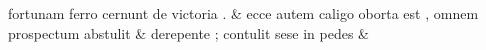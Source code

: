 \documentclass[12pt,onecolumn,twoside,a4paper]{memoir}
\begin{document}
\begin{pairs}
\begin{Leftside}
                              fortunam
                              ferro
                              cernunt
                              de
                              victoria
                              . \&
                         \stanza {}ecce
                              autem
                              caligo
                              oborta
                              est
                              ,
                              omnem
                              prospectum
                              abstulit & 
                     derepente
                              ;
                              contulit
                              sese
                              in
                              pedes \&
                     
                  \endnumbering
		\end{Leftside}
                  \begin{Rightside}
			\beginnumbering
			\numberstanzafalse
                     

\end{Rightside}
\end{pairs}
\end{document}

